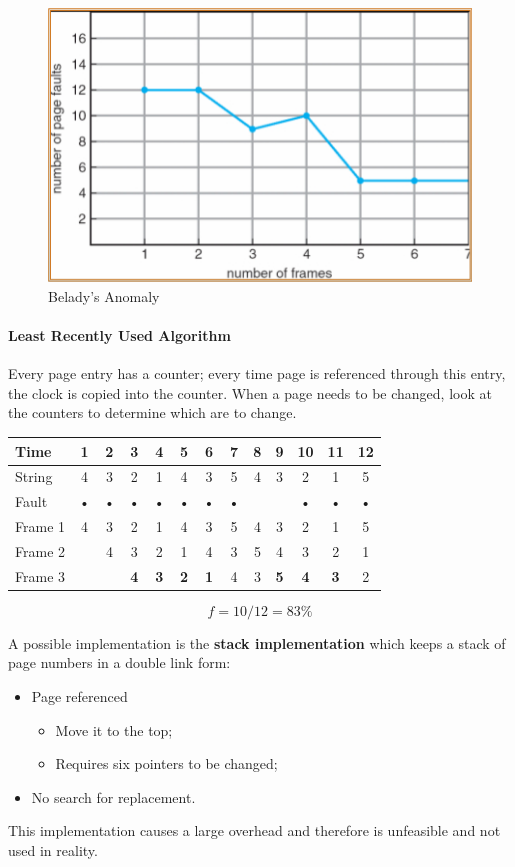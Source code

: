 \begin{figure}[hbtp]
\centering
\includegraphics[scale=0.4]{images/virtual_memory/belady_anomaly.jpg}
\caption{Belady's Anomaly}
\end{figure}

\paragraph{Least Recently Used Algorithm}
Every page entry has a counter; every time page is referenced through this entry, the clock is copied into the counter. When a page needs to be changed, look at the counters to determine which are to change.

\begin{center}
\begin{tabular}{l|cccccccccccc}
\hline
Time & 1 & 2 & 3 & 4 & 5 & 6 & 7 & 8 & 9 & 10 & 11 & 12 \\
\hline
String & 4 & 3 & 2 & 1 & 4 & 3 & 5 & 4 & 3 & 2 & 1 & 5 \\
\hline
Fault & • & • & • & • & • & • & • & & & • & • & • \\
\hline
Frame 1 & 4 & 3 & 2 & 1 & 4 & 3 & 5 & 4 & 3 & 2 & 1 & 5 \\
Frame 2 & & 4 & 3 & 2 & 1 & 4 & 3 & 5 & 4 & 3 & 2 & 1 \\
Frame 3 & & & \textbf{4} & \textbf{3} & \textbf{2} & \textbf{1} & 4 & 3 & \textbf{5} & \textbf{4} & \textbf{3} & 2 \\
\hline
\end{tabular}
\[ f = 10/12 = 83 \% \]
\end{center}

A possible implementation is the \textbf{stack implementation} which keeps a stack of page numbers in a double link form:
\begin{itemize}
\item Page referenced
\begin{itemize}
\item Move it to the top;
\item Requires six pointers to be changed;
\end{itemize}
\item No search for replacement.
\end{itemize}
This implementation causes a large overhead and therefore is unfeasible and not used in reality.

